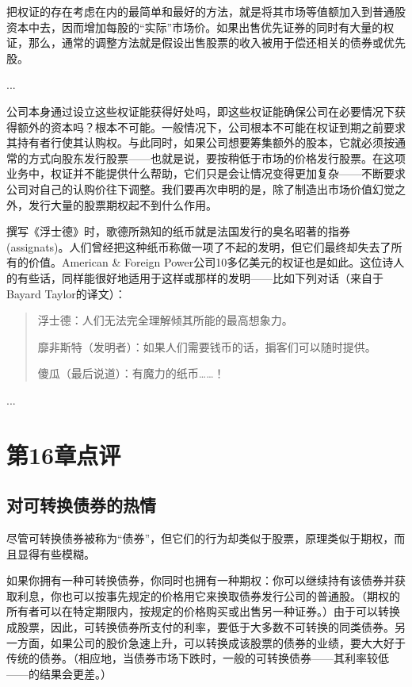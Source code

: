\documentclass[12pt,oneside]{book}
\begin{document}
把权证的存在考虑在内的最简单和最好的方法，就是将其市场等值额加入到普通股资本中去，因而增加每股的“实际”市场价。如果出售优先证券的同时有大量的权证，那么，通常的调整方法就是假设出售股票的收入被用于偿还相关的债券或优先股。

...


公司本身通过设立这些权证能获得好处吗，即这些权证能确保公司在必要情况下获得额外的资本吗？根本不可能。一般情况下，公司根本不可能在权证到期之前要求其持有者行使其认购权。与此同时，如果公司想要筹集额外的股本，它就必须按通常的方式向股东发行股票——也就是说，要按稍低于市场的价格发行股票。在这项业务中，权证并不能提供什么帮助，它们只是会让情况变得更加复杂——不断要求公司对自己的认购价往下调整。我们要再次申明的是，除了制造出市场价值幻觉之外，发行大量的股票期权起不到什么作用。

撰写《浮士德》时，歌德所熟知的纸币就是法国发行的臭名昭著的指券(assignats)。人们曾经把这种纸币称做一项了不起的发明，但它们最终却失去了所有的价值。American \& Foreign Power公司10多亿美元的权证也是如此。这位诗人的有些话，同样能很好地适用于这样或那样的发明——比如下列对话（来自于Bayard Taylor的译文）：

\begin{quotation}
浮士德：人们无法完全理解倾其所能的最高想象力。

靡非斯特（发明者）：如果人们需要钱币的话，掮客们可以随时提供。

傻瓜（最后说道）：有魔力的纸币……！
\end{quotation}



...



\section{第16章点评}
\subsection{对可转换债券的热情}
尽管可转换债券被称为“债券”，但它们的行为却类似于股票，原理类似于期权，而且显得有些模糊。

如果你拥有一种可转换债券，你同时也拥有一种期权：你可以继续持有该债券并获取利息，你也可以按事先规定的价格用它来换取债券发行公司的普通股。（期权的所有者可以在特定期限内，按规定的价格购买或出售另一种证券。）由于可以转换成股票，因此，可转换债券所支付的利率，要低于大多数不可转换的同类债券。另一方面，如果公司的股价急速上升，可以转换成该股票的债券的业绩，要大大好于传统的债券。（相应地，当债券市场下跌时，一般的可转换债券——其利率较低——的结果会更差。）
\end{document}
